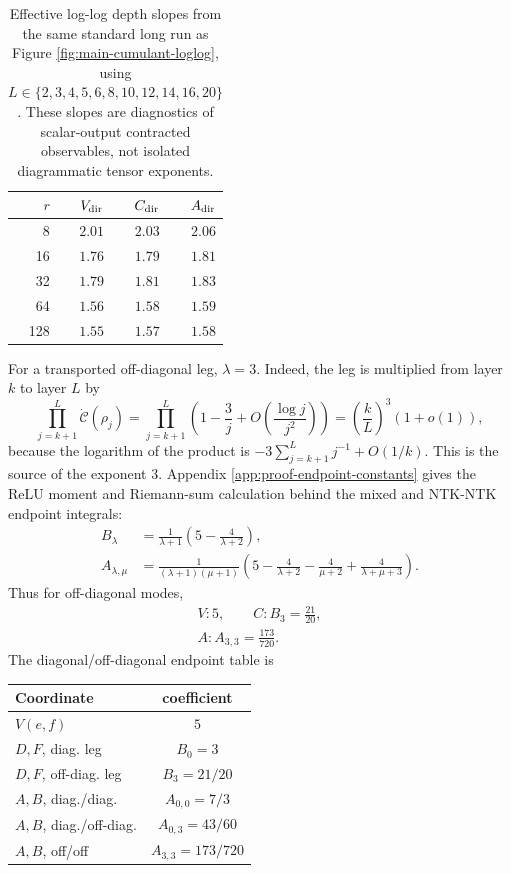 \documentclass{article}
\begin{document}
\begin{table}[H]
\centering
\caption{Effective log-log depth slopes from the same standard long run as Figure \ref{fig:main-cumulant-loglog}, using \(L\in\{2,3,4,5,6,8,10,12,14,16,20\}\). These slopes are diagnostics of scalar-output contracted observables, not isolated diagrammatic tensor exponents.}
\label{tab:effective-cumulant-slopes}
\scriptsize
\begin{tabular}{rrrr}
\toprule
\(r\) & \(V_{\rm dir}\) & \(C_{\rm dir}\) & \(A_{\rm dir}\) \\
\midrule
8 & \(2.01\) & \(2.03\) & \(2.06\) \\
16 & \(1.76\) & \(1.79\) & \(1.81\) \\
32 & \(1.79\) & \(1.81\) & \(1.83\) \\
64 & \(1.56\) & \(1.58\) & \(1.59\) \\
128 & \(1.55\) & \(1.57\) & \(1.58\) \\
\bottomrule
\end{tabular}
\end{table}
For a transported off-diagonal leg, \(\lambda=3\). Indeed, the leg is multiplied from layer \(k\) to layer \(L\) by
\[
\prod_{j=k+1}^{L}\dot{\mathcal C}(\rho_j)
=\prod_{j=k+1}^{L}\left(1-\frac3j+O\left(\frac{\log j}{j^2}\right)\right)
=\left(\frac{k}{L}\right)^3(1+o(1)),
\]
because the logarithm of the product is \(-3\sum_{j=k+1}^{L}j^{-1}+O(1/k)\). This is the source of the exponent \(3\). Appendix \ref{app:proof-endpoint-constants} gives the ReLU moment and Riemann-sum calculation behind the mixed and NTK-NTK endpoint integrals:
\begin{equation}
\begin{aligned}
B_\lambda&=\frac1{\lambda+1}\left(5-\frac4{\lambda+2}\right),\\
A_{\lambda,\mu}
&=\frac{1}{(\lambda+1)(\mu+1)}
\left(5-\frac4{\lambda+2}-\frac4{\mu+2}
+\frac4{\lambda+\mu+3}\right).
\end{aligned}
\end{equation}
Thus for off-diagonal modes,
\begin{equation}
\begin{gathered}
V: 5,\qquad C: B_3=\frac{21}{20},\\
A: A_{3,3}=\frac{173}{720}.
\end{gathered}
\label{eq:endpoint-constants}
\end{equation}
The diagonal/off-diagonal endpoint table is
\begin{center}
\scriptsize
\begin{tabular}{lc}
\toprule
Coordinate & coefficient \\
\midrule
\(V(e,f)\) & \(5\) \\
\(D,F\), diag. leg & \(B_0=3\) \\
\(D,F\), off-diag. leg & \(B_3=21/20\) \\
\(A,B\), diag./diag. & \(A_{0,0}=7/3\) \\
\(A,B\), diag./off-diag. & \(A_{0,3}=43/60\) \\
\(A,B\), off/off & \(A_{3,3}=173/720\) \\
\bottomrule
\end{tabular}
\end{center}
\end{document}

